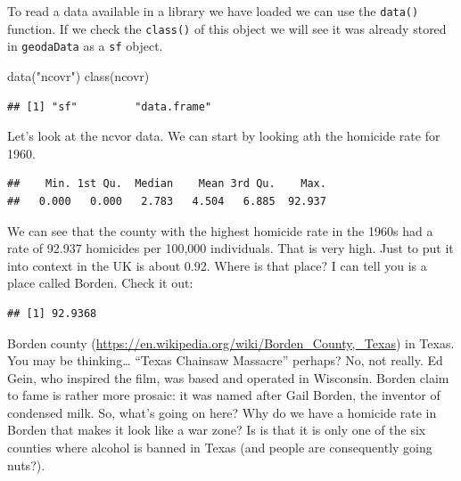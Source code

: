 \documentclass[
]{book}
\newenvironment{Shaded}{\begin{snugshade}}{\end{snugshade}}
\newcommand{\FunctionTok}[1]{\textcolor[rgb]{0.00,0.00,0.00}{#1}}
\newcommand{\NormalTok}[1]{#1}
\newcommand{\OtherTok}[1]{\textcolor[rgb]{0.56,0.35,0.01}{#1}}
\newcommand{\SpecialCharTok}[1]{\textcolor[rgb]{0.00,0.00,0.00}{#1}}
\newcommand{\StringTok}[1]{\textcolor[rgb]{0.31,0.60,0.02}{#1}}
\begin{document}
To read a data available in a library we have loaded we can use the \texttt{data()} function. If we check the \texttt{class()} of this object we will see it was already stored in \texttt{geodaData} as a \texttt{sf} object.

\begin{Shaded}
\begin{Highlighting}[]
\FunctionTok{data}\NormalTok{(}\StringTok{"ncovr"}\NormalTok{)}
\FunctionTok{class}\NormalTok{(ncovr)}
\end{Highlighting}
\end{Shaded}

\begin{verbatim}
## [1] "sf"         "data.frame"
\end{verbatim}

Let's look at the ncvor data. We can start by looking ath the homicide rate for 1960.

\begin{Shaded}
\end{Shaded}

\begin{verbatim}
##    Min. 1st Qu.  Median    Mean 3rd Qu.    Max. 
##   0.000   0.000   2.783   4.504   6.885  92.937
\end{verbatim}

We can see that the county with the highest homicide rate in the 1960s had a rate of 92.937 homicides per 100,000 individuals. That is very high. Just to put it into context in the UK is about 0.92. Where is that place? I can tell you is a place called Borden. Check it out:

\begin{Shaded}
\end{Shaded}

\begin{verbatim}
## [1] 92.9368
\end{verbatim}

Borden county (\url{https://en.wikipedia.org/wiki/Borden_County,_Texas}) in Texas. You may be thinking\ldots{} ``Texas Chainsaw Massacre'' perhaps? No, not really. Ed Gein, who inspired the film, was based and operated in Wisconsin. Borden claim to fame is rather more prosaic: it was named after Gail Borden, the inventor of condensed milk. So, what's going on here? Why do we have a homicide rate in Borden that makes it look like a war zone? Is is that it is only one of the six counties where alcohol is banned in Texas (and people are consequently going nuts?).
\end{document}
